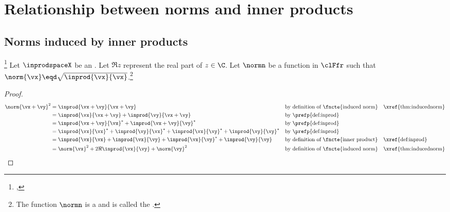 \section{Relationship between norms and inner products}
\subsection{Norms induced by inner products}
\begin{lemma}
\footnote{
  ,
  }
\label{lem:||x+y||}
\label{lem:polarid}
Let $\inprodspaceX$ be an  .
Let $\Re z$ represent the real part of $z\in\C$.
Let $\normn$ be a function in $\clFfr$ such that $\norm{\vx}\eqd\sqrt{\inprod{\vx}{\vx}}$.\footnote{
The function $\normn$ is a   and is called the 
.}
\end{lemma}
\begin{proof}
\begin{align*}
   \norm{\vx+\vy}^2
     &= \inprod{\vx+\vy}{\vx+\vy}
     && \text{by definition of \fncte{induced norm}}
     && \text{\xref{thm:inducednorm}}
   \\&= \inprod{\vx}{\vx+\vy} + \inprod{\vy}{\vx+\vy}
     && \text{by \prefp{def:inprod}}
   \\&= \inprod{\vx+\vy}{\vx}^\ast + \inprod{\vx+\vy}{\vy}^\ast
     && \text{by \prefp{def:inprod}}
   \\&= \inprod{\vx}{\vx}^\ast + \inprod{\vy}{\vx}^\ast + \inprod{\vx}{\vy}^\ast + \inprod{\vy}{\vy}^\ast
     && \text{by \prefp{def:inprod}}
   \\&= \inprod{\vx}{\vx} + \inprod{\vx}{\vy} + \inprod{\vx}{\vy}^\ast + \inprod{\vy}{\vy}
     && \text{by definition of \fncte{inner product}}
     && \text{\xref{def:inprod}}
   \\&= \norm{\vx}^2 + 2\Re\inprod{\vx}{\vy} + \norm{\vy}^2
     && \text{by definition of \fncte{induced norm}}
     && \text{\xref{thm:inducednorm}}
\end{align*}
\end{proof}



